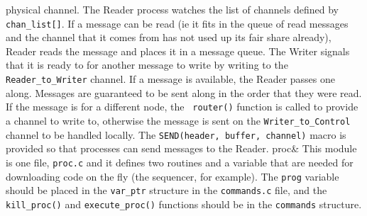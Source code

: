 {	physical channel.  The Reader process watches the list of channels
	defined by {\tt chan\_list[]}.  If a message can be read (ie it fits
	in the queue of read messages and the channel that it comes from has
	not used up its fair share already), Reader reads the message and
	places it in a message queue.  The Writer signals that it is ready to
	for another message to write by writing to the {\tt Reader\_to\_Writer}
	channel.  If a message is available, the Reader passes one along.
	Messages are guaranteed to be sent along in the order that they
	were read.  If the message is for a different node, the {\tt
	router()} function is called to provide a channel to write to,
	otherwise the message is sent on the {\tt Writer\_to\_Control}
	channel to be handled locally.  The {\tt SEND(header, buffer,
	channel)} macro is provided so that processes can send messages to
	the Reader.\cr
proc& This module is one file, {\tt proc.c} and it defines two routines and a
	variable that are needed for downloading code on the fly (the
	sequencer, for example).  The {\tt prog} variable should be placed in
	the {\tt var\_ptr} structure in the {\tt commands.c} file, and the
	{\tt kill\_proc()} and {\tt execute\_proc()} functions should be in
	the {\tt commands} structure.\cr 
}

